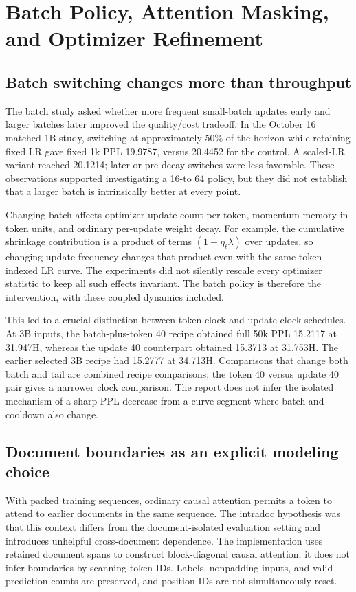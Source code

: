 \section{Batch Policy, Attention Masking, and Optimizer Refinement}
\label{sec:refinement}

\subsection{Batch switching changes more than throughput}

The batch study asked whether more frequent small-batch updates early and larger batches later improved the quality/cost tradeoff. In the October 16 matched 1B study, switching at approximately 50\% of the horizon while retaining fixed LR gave fixed 1k PPL 19.9787, versus 20.4452 for the control. A scaled-LR variant reached 20.1214; later or pre-decay switches were less favorable. These observations supported investigating a 16-to 64 policy, but they did not establish that a larger batch is intrinsically better at every point.

Changing batch affects optimizer-update count per token, momentum memory in token units, and ordinary per-update weight decay. For example, the cumulative shrinkage contribution is a product of terms $(1-\eta_t\lambda)$ over updates, so changing update frequency changes that product even with the same token-indexed LR curve. The experiments did not silently rescale every optimizer statistic to keep all such effects invariant. The batch policy is therefore the intervention, with these coupled dynamics included.

This led to a crucial distinction between token-clock and update-clock schedules. At 3B inputs, the batch-plus-token 40 recipe obtained full 50k PPL 15.2117 at 31.947H, whereas the update 40 counterpart obtained 15.3713 at 31.753H. The earlier selected 3B recipe had 15.2777 at 34.713H. Comparisons that change both batch and tail are combined recipe comparisons; the token 40 versus update 40 pair gives a narrower clock comparison. The report does not infer the isolated mechanism of a sharp PPL decrease from a curve segment where batch and cooldown also change.

\subsection{Document boundaries as an explicit modeling choice}

With packed training sequences, ordinary causal attention permits a token to attend to earlier documents in the same sequence. The intradoc hypothesis was that this context differs from the document-isolated evaluation setting and introduces unhelpful cross-document dependence. The implementation uses retained document spans to construct block-diagonal causal attention; it does not infer boundaries by scanning token IDs. Labels, nonpadding inputs, and valid prediction counts are preserved, and position IDs are not simultaneously reset.

